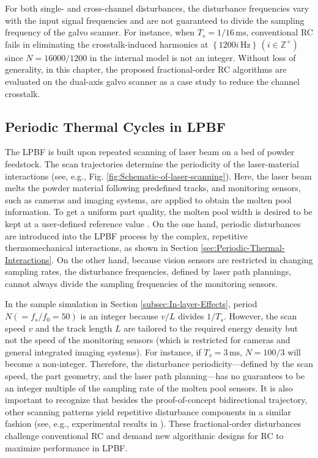 \documentclass [11pt, proquest] {uwthesis}[2020/02/24]
\begin{document}
For both single- and cross-channel disturbances, the disturbance frequencies
vary with the input signal frequencies and are not guaranteed to divide
the sampling frequency of the galvo scanner. For instance, when $T_{s}=1/16\,\text{ms}$,
conventional RC fails in eliminating the crosstalk-induced harmonics
at $\left\{ 1200i\,\text{Hz}\right\} \,(i\in\mathbb{Z}^{+})$ since
$N=16000/1200$ in the internal model is not an integer. Without loss
of generality, in this chapter, the proposed fractional-order RC algorithms
are evaluated on the dual-axis galvo scanner as a case study to reduce
the channel crosstalk.

\subsection{Periodic Thermal Cycles in LPBF} \label{subec:Periodic-thermal-cycles}

The LPBF is built upon repeated scanning of laser beam on a bed of
powder feedstock. The scan trajectories determine the periodicity
of the laser-material interactions (see, e.g., Fig. \ref{fig:Schematic-of-laser-scanning}).
Here, the laser beam melts the powder material following predefined
tracks, and monitoring sensors, such as cameras and imaging systems,
are applied to obtain the molten pool information. To get a uniform
part quality, the molten pool width is desired to be kept at a user-defined
reference value \cite{hofman2012camera}. On the one hand, periodic
disturbances are introduced into the LPBF process by the complex, repetitive
thermomechanical interactions, as shown in Section \ref{sec:Periodic-Thermal-Interactions}. On the other hand, because vision sensors
are restricted in changing sampling rates, the disturbance frequencies,
defined by laser path plannings, cannot always divide the sampling
frequencies of the monitoring sensors.

In the sample simulation in Section \ref{subsec:In-layer-Effects}, period $N(=f_{s}/f_{0}=50)$ is an integer
because $v/L$ divides $1/T_{s}$. However, the scan speed $v$ and
the track length $L$ are tailored to the required energy density
but not the speed of the monitoring sensors (which is restricted for
cameras and general integrated imaging systems). For instance, if
$T_{s}=3\,\text{ms}$, $N=100/3$ will become a non-integer. Therefore,
the disturbance periodicity—defined by the scan speed, the part geometry,
and the laser path planning—has no guarantees to be an integer multiple
of the sampling rate of the molten pool sensors. It is also important
to recognize that besides the proof-of-concept bidirectional trajectory,
other scanning patterns yield repetitive disturbance components in
a similar fashion (see, e.g., experimental results in \cite{dunbar2017comparisons}).
These fractional-order disturbances challenge conventional RC and
demand new algorithmic designs for RC to maximize performance in LPBF.
\end{document}
